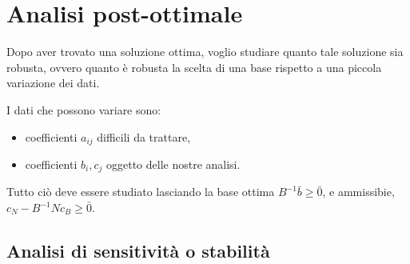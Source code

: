 \chapter{Analisi post-ottimale}
Dopo aver trovato una soluzione ottima, voglio studiare quanto tale soluzione sia robusta, ovvero quanto è robusta la scelta di una base rispetto a una piccola variazione dei dati.

I dati che possono variare sono:

\begin{itemize}
	\item coefficienti $a_{ij}$ difficili da trattare,
	\item coefficienti $b_i, c_j$ oggetto delle nostre analisi.
\end{itemize}

Tutto ciò deve essere studiato lasciando la base ottima $B^{-1}\bar{b} \geq \bar{0}$, e ammissibie, $c_N - B^{-1}Nc_B \geq \bar{0}$.

\section{Analisi di sensitività o stabilità}

